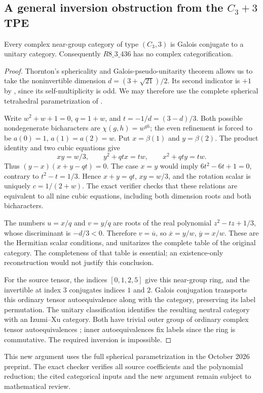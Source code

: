\subsection{A general inversion obstruction from the $C_3+3$ TPE}
\begin{proposition}
Every complex near-group category of type $(C_3,3)$ is Galois conjugate to
a unitary category. Consequently $R8\_3\_436$ has no complex categorification.
\end{proposition}
\begin{proof}
Thornton's sphericality and Galois-pseudo-unitarity theorem
\cite[Theorem~1.3]{ThorntonNear} allows us to take the noninvertible
dimension $d=(3+\sqrt{21})/2$. Its second indicator is $+1$ by
\cite[Theorem~3.9]{LPRV}, since its self-multiplicity is odd.
We may therefore use the complete spherical tetrahedral parametrization
of \cite[Theorem~2.3, Proposition~2.7, Theorem~4.12]{NearGroupTPE2026}.

Write $w^2+w+1=0$, $q=1+w$, and $t=-1/d=(3-d)/3$.
Both possible nondegenerate bicharacters are $\chi(g,h)=w^{gh}$;
the even refinement is forced to be $a(0)=1$, $a(1)=a(2)=w$.
Put $x=\beta(1)$ and $y=\beta(2)$.
The product identity and two cubic equations give
\[
xy=w/3,\qquad y^2+qtx=tw,\qquad x^2+qty=tw.
\]
Thus $(y-x)(x+y-qt)=0$. The case $x=y$ would imply
$6t^2-6t+1=0$, contrary to $t^2-t=1/3$.
Hence $x+y=qt$, $xy=w/3$, and the rotation scalar is uniquely
$c=1/(2+w)$. The exact verifier checks that these relations are equivalent
to all nine cubic equations, including both dimension roots and both
bicharacters.

The numbers $u=x/q$ and $v=y/q$ are roots of the real polynomial
$z^2-tz+1/3$, whose discriminant is $-d/3<0$.
Therefore $v=\overline u$, so
$\overline x=y/w$, $\overline y=x/w$.
These are the Hermitian scalar conditions, and
\cite[Corollary~5.5]{NearGroupTPE2026} unitarizes the complete table of
the original category. The completeness of that table is essential;
an existence-only reconstruction would not justify this conclusion.

For the source tensor, the indices $[0,1,2,5]$ give this near-group ring,
and the invertible at index $3$ conjugates indices $1$ and $2$.
Galois conjugation transports this ordinary tensor autoequivalence along
with the category, preserving its label permutation. The unitary
classification \cite[Theorem~9.1, Example~9.4]{IzumiNear} identifies
the resulting neutral category with an Izumi--Xu category.
Both have trivial outer group of ordinary complex tensor
autoequivalences \cite[Section~4.2, p.~10]{GJSCyclic}; inner
autoequivalences fix labels since the ring is commutative.
The required inversion is impossible.
\end{proof}
This new argument uses the full spherical parametrization in the October
2026 preprint. The exact checker verifies all source coefficients and the
polynomial reduction; the cited categorical inputs and the new argument
remain subject to mathematical review.
